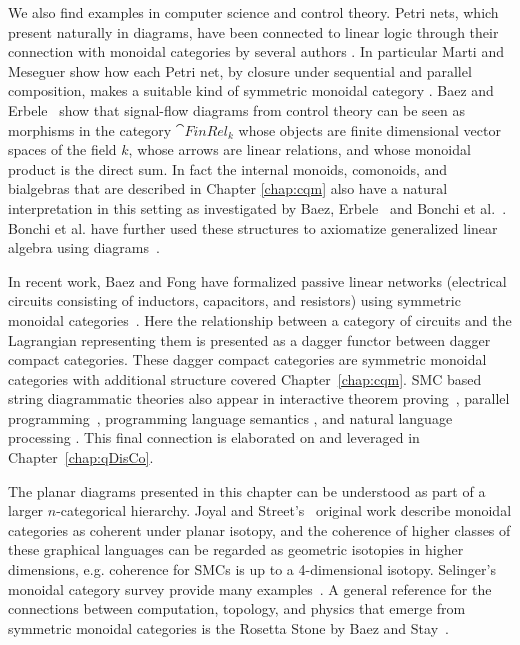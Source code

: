 We also find examples in computer science and control theory. Petri nets, which present naturally in diagrams, have been connected to linear logic through their connection with monoidal categories by several authors \cite{abramsky2008petri,marti1989petri,sassone1998axiomatization}. In particular Marti and Meseguer show how each Petri net, by closure under sequential and parallel composition, makes a suitable kind of symmetric monoidal category \cite{marti1989petri,meseguer1990petri}. Baez and Erbele~\cite{baez2014categories} show that signal-flow diagrams from control theory can be seen as morphisms in the category $\cat{FinRel_k}$ whose objects are finite dimensional vector spaces of the field $k$, whose arrows are linear relations, and whose monoidal product is the direct sum.  In fact the internal monoids, comonoids, and bialgebras that are described in Chapter \ref{chap:cqm} also have a natural interpretation in this setting as investigated by Baez, Erbele~\cite{baez2014categories} and Bonchi et al.~\cite{bonchi2015full}. Bonchi et al. have further used these structures to axiomatize generalized linear algebra using diagrams~\cite{bonchi2014interacting}.
 
In recent work, Baez and Fong have formalized passive linear networks (electrical circuits consisting of inductors, capacitors, and resistors) using symmetric monoidal categories~\cite{baez2015compositional}. Here the relationship between a category of circuits and the Lagrangian representing them is presented as a dagger functor between dagger compact categories. These dagger compact categories are symmetric monoidal categories with additional structure covered Chapter~\ref{chap:cqm}. SMC based string diagrammatic theories also appear in interactive theorem proving~\cite{grov2014tinker}, parallel programming~\cite{michaelson2012reasoning}, programming language semantics \cite{mellies2014local}, and natural language processing \cite{coecke2010mathematical}. This final connection is elaborated on and leveraged in Chapter~\ref{chap:qDisCo}.

The planar diagrams presented in this chapter can be understood as part of a larger $n$-categorical hierarchy. Joyal and Street's~\cite{joyal1991geometry} original work describe monoidal categories as coherent under planar isotopy, and the coherence of higher classes of these graphical languages can be regarded as geometric isotopies in higher dimensions, e.g. coherence for SMCs is up to a 4-dimensional isotopy. Selinger's monoidal category survey provide many examples~\cite{selinger2011survey}. A general reference for the connections between computation, topology, and physics that emerge from symmetric monoidal categories is the Rosetta Stone by Baez and Stay~\cite{baez2011physics}.


